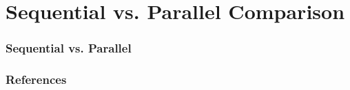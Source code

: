 \documentclass[13pt]{beamer}
\begin{document}
\section{Sequential vs. Parallel Comparison} %
\begin{frame}
\frametitle{Sequential vs. Parallel}
\end{frame}

 \begin{frame}
  \frametitle{References}
  \nocite{*} 
  
\end{frame}
\end{document}
